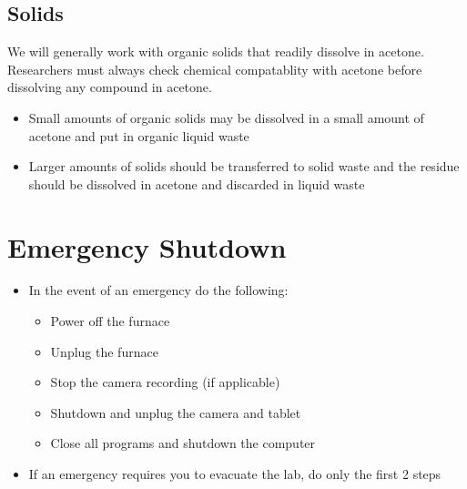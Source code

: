 \documentclass[letterpaper,11pt]{article}
\begin{document}
    \subsection{Solids} \label{sec:spill_solid}
    We will generally work with organic solids that readily dissolve
    in acetone. Researchers must always check chemical compatablity with acetone
    before dissolving any compound in acetone.
    \begin{itemize}
    \item Small amounts of organic solids may be dissolved in a small amount of 
        acetone and put in organic liquid waste
    \item Larger amounts of solids should be transferred to solid waste and the
        residue should be dissolved in acetone and discarded in liquid waste
    \end{itemize}

\newpage
\section{Emergency Shutdown} \label{sec:e_shtdn}

    \begin{itemize}
    \item In the event of an emergency do the following:
        
        \begin{itemize}
        \item Power off the furnace
        \item Unplug the furnace
        \item Stop the camera recording (if applicable)
        \item Shutdown and unplug the camera and tablet
        \item Close all programs and shutdown the computer
        \end{itemize}
    
    \item If an emergency requires you to evacuate the lab, do only the first 
        2 steps
    \end{itemize}
    
\end{document}
